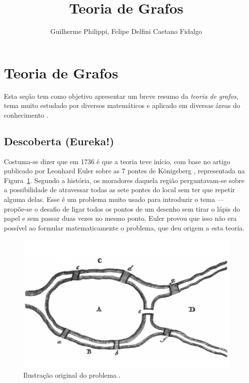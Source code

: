 \documentclass[a4paper,12pt]{article}
\title{Teoria de Grafos}
\author{Guilherme Philippi, Felipe Delfini Caetano Fidalgo}
\begin{document}
\maketitle
\tableofcontents

\section{Teoria de Grafos\label{sec:grafos}}
Esta seção tem como objetivo apresentar um breve resumo da \textit{teoria de grafos}, tema muito estudado por diversos matemáticos e aplicado em diversas áreas do conhecimento \cite{graphTheoryApplicationsBondy}.

\subsection{Descoberta (Eureka!)}
Costuma-se dizer que em 1736 é que a teoria teve início, com base no artigo publicado por Leonhard Euler sobre as 7 pontes de Königsberg \cite{euler:KOENIGSBERG} \cite{graphTheoryApplicationsBondy}, representada na Figura~\ref{fig:koni}. Segundo a história, os moradores daquela região perguntavam-se sobre a possibilidade de atravessar todas as sete pontes do local sem ter que repetir alguma delas. Esse é um problema muito usado para introduzir o tema \cite{problemsInMath} --- propõe-se o desafio de ligar todos os pontos de um desenho sem tirar o lápis do papel e sem passar duas vezes no mesmo ponto. Euler provou que isso não era possível ao formular matematicamente o problema, que deu origem a esta teoria.

\begin{figure}[H]
	\begin{center}
		\includegraphics[width=0.7\linewidth]{figures/koenigsbern.png}
	\end{center}
	\caption{Ilustração original do problema \cite{euler:KOENIGSBERG}.}
	\label{fig:koni}
\end{figure}
\end{document}
